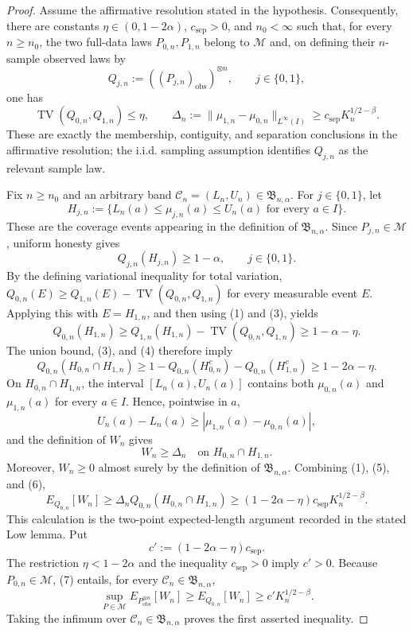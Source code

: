 \documentclass{article}
\begin{document}
\begin{proof}
Assume the affirmative resolution stated in the hypothesis.  Consequently, there are constants \(\eta\in(0,1-2\alpha)\), \(c_{\mathrm{sep}}>0\), and \(n_0<\infty\) such that, for every \(n\ge n_0\), the two full-data laws \(P_{0,n},P_{1,n}\) belong to \(\mathcal M\) and, on defining their \(n\)-sample observed laws by
\[
Q_{j,n}:=((P_{j,n})_{\mathrm{obs}})^{\otimes n},\qquad j\in\{0,1\},
\]
one has
\[
\operatorname{TV}(Q_{0,n},Q_{1,n})\le \eta,
\qquad
\Delta_n:=\|\mu_{1,n}-\mu_{0,n}\|_{L^\infty(I)}
\ge c_{\mathrm{sep}}K_n^{1/2-\beta}.
\tag{1}
\]
These are exactly the membership, contiguity, and separation conclusions in the affirmative resolution; the i.i.d. sampling assumption identifies \(Q_{j,n}\) as the relevant sample law.

Fix \(n\ge n_0\) and an arbitrary band \(\mathcal C_n=(L_n,U_n)\in\mathfrak B_{n,\alpha}\).  For \(j\in\{0,1\}\), let
\[
H_{j,n}:=\bigl\{L_n(a)\le \mu_{j,n}(a)\le U_n(a)
                  \text{ for every }a\in I\bigr\}.
\tag{2}
\]
These are the coverage events appearing in the definition of \(\mathfrak B_{n,\alpha}\).  Since \(P_{j,n}\in\mathcal M\), uniform honesty gives
\[
Q_{j,n}(H_{j,n})\ge 1-\alpha,
\qquad j\in\{0,1\}.
\tag{3}
\]
By the defining variational inequality for total variation, \(Q_{0,n}(E)\ge Q_{1,n}(E)-\operatorname{TV}(Q_{0,n},Q_{1,n})\) for every measurable event \(E\).  Applying this with \(E=H_{1,n}\), and then using (1) and (3), yields
\[
Q_{0,n}(H_{1,n})
\ge Q_{1,n}(H_{1,n})-\operatorname{TV}(Q_{0,n},Q_{1,n})
\ge 1-\alpha-\eta.
\tag{4}
\]
The union bound, (3), and (4) therefore imply
\[
Q_{0,n}(H_{0,n}\cap H_{1,n})
\ge 1-Q_{0,n}(H_{0,n}^{c})-Q_{0,n}(H_{1,n}^{c})
\ge 1-2\alpha-\eta.
\tag{5}
\]
On \(H_{0,n}\cap H_{1,n}\), the interval \([L_n(a),U_n(a)]\) contains both \(\mu_{0,n}(a)\) and \(\mu_{1,n}(a)\) for every \(a\in I\).  Hence, pointwise in \(a\),
\[
U_n(a)-L_n(a)\ge |\mu_{1,n}(a)-\mu_{0,n}(a)|,
\]
and the definition of \(W_n\) gives
\[
W_n\ge \Delta_n
\quad\text{on }H_{0,n}\cap H_{1,n}.
\tag{6}
\]
Moreover, \(W_n\ge0\) almost surely by the definition of \(\mathfrak B_{n,\alpha}\).  Combining (1), (5), and (6),
\[
E_{Q_{0,n}}[W_n]
\ge \Delta_n Q_{0,n}(H_{0,n}\cap H_{1,n})
\ge (1-2\alpha-\eta)c_{\mathrm{sep}}K_n^{1/2-\beta}.
\tag{7}
\]
This calculation is the two-point expected-length argument recorded in the stated Low lemma.  Put
\[
c':=(1-2\alpha-\eta)c_{\mathrm{sep}}.
\]
The restriction \(\eta<1-2\alpha\) and the inequality \(c_{\mathrm{sep}}>0\) imply \(c'>0\).  Because \(P_{0,n}\in\mathcal M\), (7) entails, for every \(\mathcal C_n\in\mathfrak B_{n,\alpha}\),
\[
\sup_{P\in\mathcal M}E_{P_{\mathrm{obs}}^{\otimes n}}[W_n]
\ge E_{Q_{0,n}}[W_n]
\ge c'K_n^{1/2-\beta}.
\]
Taking the infimum over \(\mathcal C_n\in\mathfrak B_{n,\alpha}\) proves the first asserted inequality.


\end{proof}
\end{document}
